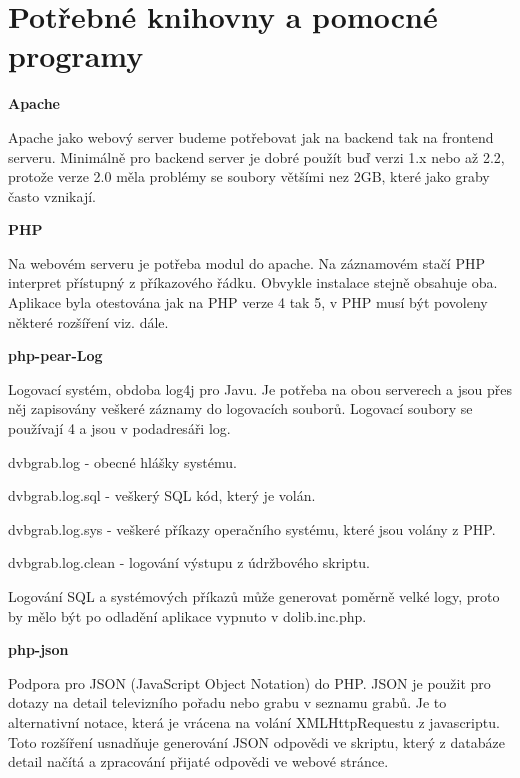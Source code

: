 \section{Potřebné knihovny a pomocné programy}

\vspace{10pt}

\textbf{Apache}

Apache jako webový server budeme potřebovat jak na backend tak na frontend serveru.
Minimálně pro backend server je dobré použít buď verzi 1.x nebo až 2.2, protože verze 2.0 měla problémy se soubory většími nez 2GB, které jako graby často vznikají.

\vspace{10pt}

\textbf{PHP}

Na webovém serveru je potřeba modul do apache. Na záznamovém stačí PHP interpret přístupný z příkazového řádku. Obvykle instalace stejně obsahuje oba. Aplikace byla otestována jak na PHP verze 4 tak 5, v PHP musí být povoleny některé rozšíření viz. dále.

\vspace{10pt}

\textbf{php-pear-Log}

Logovací systém, obdoba log4j pro Javu. Je potřeba na obou serverech a jsou přes něj zapisovány veškeré záznamy do logovacích souborů. Logovací soubory se používají 4 a jsou v podadresáři log.

dvbgrab.log - obecné hlášky systému.

dvbgrab.log.sql - veškerý SQL kód, který je volán.

dvbgrab.log.sys - veškeré příkazy operačního systému, které jsou volány z PHP.

dvbgrab.log.clean - logování výstupu z údržbového skriptu.

Logování SQL a systémových příkazů může generovat poměrně velké logy, proto by mělo být po odladění aplikace vypnuto v dolib.inc.php.

\vspace{10pt}

\textbf{php-json}

Podpora pro JSON (JavaScript Object Notation) do PHP. JSON je použit pro dotazy na detail televizního pořadu nebo grabu v seznamu grabů. Je to alternativní notace, která je vrácena na volání XMLHttpRequestu z javascriptu. Toto rozšíření usnadňuje generování JSON odpovědi ve skriptu, který z databáze detail načítá a zpracování přijaté odpovědi ve webové stránce.

